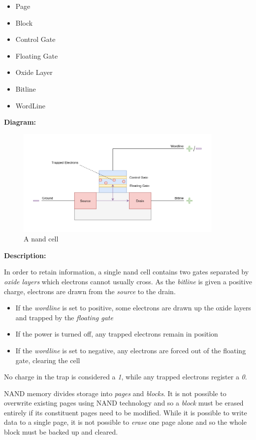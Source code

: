 \documentclass[10pt]{article}
\begin{document}
\begin{itemize}
\item Page
\item Block
\item Control Gate
\item Floating Gate
\item Oxide Layer
\item Bitline
\item WordLine
\end{itemize}

\textbf{Diagram:}

\begin{figure}[H]
\centering
\includegraphics[width=0.9\textwidth,keepaspectratio, frame]{./images/nand_flash.png}
\caption{A nand cell}
\end{figure}

\textbf{Description:}

In order to retain information, a single nand cell contains two gates separated by \emph{oxide layers} which electrons cannot usually cross. As the \emph{bitline} is given a positive charge, electrons are drawn from the \emph{source} to the drain.

\begin{itemize}
\item If the \emph{wordline} is set to positive, some electrons are drawn up the oxide layers and trapped by the \emph{floating gate}
\item If the power is turned off, any trapped electrons remain in position
\item If the \emph{wordline} is set to negative, any electrons are forced out of the floating gate, clearing the cell
\end{itemize}

No charge in the trap is considered a \emph{1}, while any trapped electrons register a \emph{0}.

NAND memory divides storage into \emph{pages} and \emph{blocks}. It is not possible to overwrite existing pages using NAND technology and so a \emph{block} must be erased entirely if its constituent pages need to be modified. While it is possible to write data to a single page, it is not possible to \emph{erase} one page alone and so the whole block must be  backed up and cleared.
\end{document}
